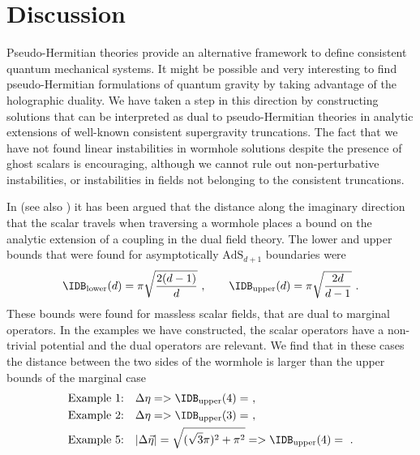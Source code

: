 \section{Discussion}\label{sec:discuss}

Pseudo-Hermitian theories provide an alternative framework to define consistent quantum mechanical systems. It might be possible and very interesting to find pseudo-Hermitian formulations of quantum gravity by taking advantage of the holographic duality. We have taken a step in this direction by constructing solutions that can be interpreted as dual to pseudo-Hermitian theories in analytic extensions of well-known consistent supergravity truncations. The fact that we have not found linear instabilities in wormhole solutions despite the presence of ghost scalars is encouraging, although we cannot rule out non-perturbative instabilities, or instabilities in fields not belonging to the consistent truncations. 

In \cite{Maldacena:2026jqd} (see also \cite{DiUbaldo:2026rly,Etheredge:2026rio}) it has been argued that the distance along the imaginary direction that the scalar travels when traversing a wormhole places a bound on the analytic extension of a coupling in the dual field theory. The lower and upper bounds that were found for asymptotically $\text{AdS}_{d+1}$ boundaries were
\begin{equation}
	\IDB_{\text{lower}}(d)
	=
	\pi \sqrt{\frac{2(d-1)}{d}}
	\ , \qquad 
	\IDB_{\text{upper}}(d)
	=
	\pi \sqrt{\frac{2d}{d-1}}\ .
\end{equation}
These bounds were found for massless scalar fields, that are dual to marginal operators. In the examples we have constructed, the scalar operators have a non-trivial potential and the dual operators are relevant. We find that in these cases the distance between the two sides of the wormhole is larger than the upper bounds of the marginal case
\begin{align}
\text{Example 1:}\quad& \Delta \eta=> \IDB_{\text{upper}}(4)=
\ ,\\
\text{Example 2:}\quad& \Delta \eta=> \IDB_{\text{upper}}(3)=
\ ,\\
\text{Example 5:}\quad& |\Delta \vec \eta|= \sqrt{(\sqrt{3}\pi)^2+\pi^2} =  > \IDB_{\text{upper}}(4)=\ .
\end{align}

